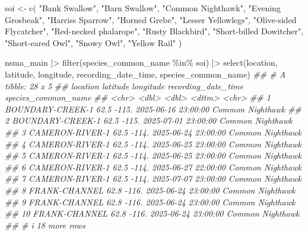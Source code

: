 \documentclass[
  letterpaper,
  DIV=11,
  numbers=noendperiod,
  oneside]{scrartcl}
\newenvironment{Shaded}{\begin{snugshade}}{\end{snugshade}}
\newcommand{\DocumentationTok}[1]{\textcolor[rgb]{0.37,0.37,0.37}{\textit{#1}}}
\newcommand{\FunctionTok}[1]{\textcolor[rgb]{0.28,0.35,0.67}{#1}}
\newcommand{\NormalTok}[1]{\textcolor[rgb]{0.00,0.23,0.31}{#1}}
\newcommand{\OtherTok}[1]{\textcolor[rgb]{0.00,0.23,0.31}{#1}}
\newcommand{\SpecialCharTok}[1]{\textcolor[rgb]{0.37,0.37,0.37}{#1}}
\newcommand{\StringTok}[1]{\textcolor[rgb]{0.13,0.47,0.30}{#1}}
\begin{document}
\begin{Shaded}
\begin{Highlighting}[]
\NormalTok{soi }\OtherTok{\textless{}{-}} \FunctionTok{c}\NormalTok{(}
  \StringTok{"Bank Swallow"}\NormalTok{,}
  \StringTok{"Barn Swallow"}\NormalTok{,}
  \StringTok{"Common Nighthawk"}\NormalTok{,}
  \StringTok{"Evening Grosbeak"}\NormalTok{,}
  \StringTok{"Harris\textquotesingle{}s Sparrow"}\NormalTok{,}
  \StringTok{"Horned Grebe"}\NormalTok{,}
  \StringTok{"Lesser Yellowlegs"}\NormalTok{,}
  \StringTok{"Olive{-}sided Flycatcher"}\NormalTok{,}
  \StringTok{"Red{-}necked phalarope"}\NormalTok{,}
  \StringTok{"Rusty Blackbird"}\NormalTok{,}
  \StringTok{"Short{-}billed Dowitcher"}\NormalTok{,}
  \StringTok{"Short{-}eared Owl"}\NormalTok{,}
  \StringTok{"Snowy Owl"}\NormalTok{,}
  \StringTok{"Yellow Rail"}
\NormalTok{)}

\NormalTok{nsma\_main }\SpecialCharTok{|\textgreater{}}
  \FunctionTok{filter}\NormalTok{(species\_common\_name }\SpecialCharTok{\%in\%}\NormalTok{ soi) }\SpecialCharTok{|\textgreater{}}
  \FunctionTok{select}\NormalTok{(location, latitude, longitude, recording\_date\_time, species\_common\_name) }
\DocumentationTok{\#\# \# A tibble: 28 x 5}
\DocumentationTok{\#\#    location         latitude longitude recording\_date\_time species\_common\_name}
\DocumentationTok{\#\#    \textless{}chr\textgreater{}               \textless{}dbl\textgreater{}     \textless{}dbl\textgreater{} \textless{}dttm\textgreater{}              \textless{}chr\textgreater{}              }
\DocumentationTok{\#\#  1 BOUNDARY{-}CREEK{-}1     62.5     {-}115. 2025{-}06{-}16 23:00:00 Common Nighthawk   }
\DocumentationTok{\#\#  2 BOUNDARY{-}CREEK{-}1     62.5     {-}115. 2025{-}07{-}01 23:00:00 Common Nighthawk   }
\DocumentationTok{\#\#  3 CAMERON{-}RIVER{-}1      62.5     {-}114. 2025{-}06{-}24 23:00:00 Common Nighthawk   }
\DocumentationTok{\#\#  4 CAMERON{-}RIVER{-}1      62.5     {-}114. 2025{-}06{-}25 23:00:00 Common Nighthawk   }
\DocumentationTok{\#\#  5 CAMERON{-}RIVER{-}1      62.5     {-}114. 2025{-}06{-}25 23:00:00 Common Nighthawk   }
\DocumentationTok{\#\#  6 CAMERON{-}RIVER{-}1      62.5     {-}114. 2025{-}06{-}27 22:00:00 Common Nighthawk   }
\DocumentationTok{\#\#  7 CAMERON{-}RIVER{-}1      62.5     {-}114. 2025{-}07{-}07 23:00:00 Common Nighthawk   }
\DocumentationTok{\#\#  8 FRANK{-}CHANNEL        62.8     {-}116. 2025{-}06{-}24 23:00:00 Common Nighthawk   }
\DocumentationTok{\#\#  9 FRANK{-}CHANNEL        62.8     {-}116. 2025{-}06{-}24 23:00:00 Common Nighthawk   }
\DocumentationTok{\#\# 10 FRANK{-}CHANNEL        62.8     {-}116. 2025{-}06{-}24 23:00:00 Common Nighthawk   }
\DocumentationTok{\#\# \# i 18 more rows}
\end{Highlighting}
\end{Shaded}
\end{document}
